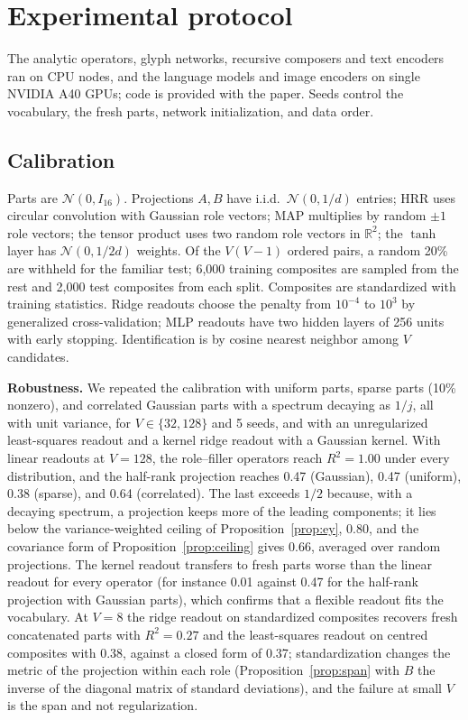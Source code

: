 \documentclass[10pt]{article}
\theoremstyle{plain}
\theoremstyle{remark}
\newcommand{\R}{\mathbb{R}}
\begin{document}
\section{Experimental protocol}
\label{app:protocol}

The analytic operators, glyph networks, recursive composers and text encoders ran on CPU nodes, and the language models and image encoders on single NVIDIA A40 GPUs; code is provided with the paper. Seeds control the vocabulary, the fresh parts, network initialization, and data order.

\subsection{Calibration}
Parts are $\mathcal{N}(0, I_{16})$. Projections $A, B$ have i.i.d.\ $\mathcal{N}(0, 1/d)$ entries; HRR uses circular convolution with Gaussian role vectors; MAP multiplies by random $\pm 1$ role vectors; the tensor product uses two random role vectors in $\R^2$; the $\tanh$ layer has $\mathcal{N}(0, 1/2d)$ weights. Of the $V(V-1)$ ordered pairs, a random 20\% are withheld for the familiar test; 6{,}000 training composites are sampled from the rest and 2{,}000 test composites from each split. Composites are standardized with training statistics. Ridge readouts choose the penalty from $10^{-4}$ to $10^{3}$ by generalized cross-validation; MLP readouts have two hidden layers of 256 units with early stopping. Identification is by cosine nearest neighbor among $V$ candidates.

\textbf{Robustness.} We repeated the calibration with uniform parts, sparse parts (10\% nonzero), and correlated Gaussian parts with a spectrum decaying as $1/j$, all with unit variance, for $V \in \{32, 128\}$ and 5 seeds, and with an unregularized least-squares readout and a kernel ridge readout with a Gaussian kernel. With linear readouts at $V = 128$, the role--filler operators reach $R^2 = 1.00$ under every distribution, and the half-rank projection reaches 0.47 (Gaussian), 0.47 (uniform), 0.38 (sparse), and 0.64 (correlated). The last exceeds $1/2$ because, with a decaying spectrum, a projection keeps more of the leading components; it lies below the variance-weighted ceiling of Proposition~\ref{prop:ey}, 0.80, and the covariance form of Proposition~\ref{prop:ceiling} gives 0.66, averaged over random projections. The kernel readout transfers to fresh parts worse than the linear readout for every operator (for instance 0.01 against 0.47 for the half-rank projection with Gaussian parts), which confirms that a flexible readout fits the vocabulary. At $V = 8$ the ridge readout on standardized composites recovers fresh concatenated parts with $R^2 = 0.27$ and the least-squares readout on centred composites with 0.38, against a closed form of 0.37; standardization changes the metric of the projection within each role (Proposition~\ref{prop:span} with $B$ the inverse of the diagonal matrix of standard deviations), and the failure at small $V$ is the span and not regularization.
\end{document}
